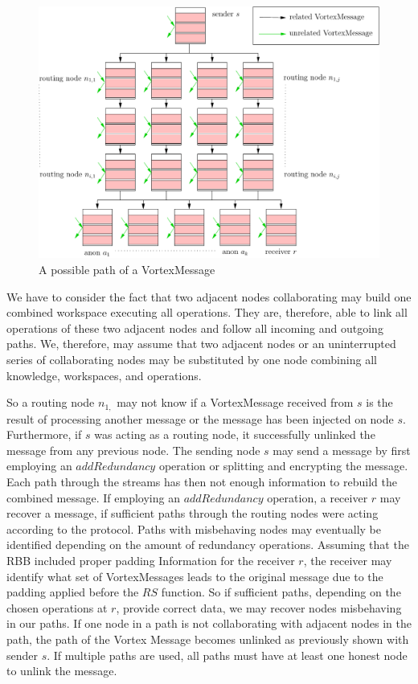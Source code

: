 \documentclass[10pt,journal,compsoc,twocolumn,twoside]{IEEEtran}
\let\MYoriglatexcaption\caption
\renewcommand{\caption}[2][\relax]{\MYoriglatexcaption[#2]{#2}}
\begin{document}
\begin{figure}[ht]
	\centering\includegraphics[width=0.8\columnwidth]{messagePaths}
	\caption{A possible path of a VortexMessage}
	\label{fig:messagePaths}
\end{figure}

We have to consider the fact that two adjacent nodes collaborating may build one combined workspace executing all operations. They are, therefore, able to link all operations of these two adjacent nodes and follow all incoming and outgoing paths. We, therefore, may assume that two adjacent nodes or an uninterrupted series of collaborating nodes may be substituted by one node combining all knowledge, workspaces, and operations.

So a routing node $n_{1,}$ may not know if a VortexMessage received from $s$ is the result of processing another message or the message has been injected on node $s$. Furthermore, if $s$ was acting as a routing node, it successfully unlinked the message from any previous node. The sending node $s$ may send a message by first employing an $addRedundancy$ operation or splitting and encrypting the message. Each path through the streams has then not enough information to rebuild the combined message. If employing an $addRedundancy$ operation, a receiver $r$ may recover a message, if sufficient paths through the routing nodes were acting according to the protocol. Paths with misbehaving nodes may eventually be identified depending on the amount of redundancy operations. Assuming that the RBB included proper padding Information for the receiver $r$, the receiver may identify what set of VortexMessages leads to the original message due to the padding applied before the $RS$ function. So if sufficient paths, depending on the chosen operations at $r$, provide correct data, we may recover nodes misbehaving in our paths. If one node in a path is not collaborating with adjacent nodes in the path, the path of the Vortex Message becomes unlinked as previously shown with sender $s$. If multiple paths are used, all paths must have at least one honest node to unlink the message. 
\end{document}
